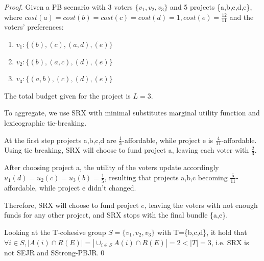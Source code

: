\documentclass[runningheads]{llncs}
\begin{document}
\begin{proof}
Given a PB scenario with 3 voters $\{v_1,v_2,v_3\}$ and 5 projects \{a,b,c,d,e\}, where $cost(a)=cost(b)=cost(c)=cost(d)=1, cost(e)=\frac{12}{11}$ and the voters' preferences:
\begin{enumerate}
    \item $v_1: \{(b),(c),(a,d),(e)\}$
    \item $v_2: \{(b),(a,c),(d),(e)\}$
    \item $v_3: \{(a,b),(c),(d),(e)\}$
\end{enumerate}

The total budget given for the project is $L=3$.

To aggregate, we use SRX with minimal substitutes marginal utility function and lexicographic tie-breaking.

At the first step projects a,b,c,d are $\frac{1}{3}$-affordable, while project e is $\frac{4}{11}$-affordable. Using tie breaking, SRX will choose to fund project a, leaving each voter with $\frac{2}{3}$.

After choosing project a, the utility of the voters update accordingly $u_1(d)=u_2(c)=u_3(b)=\frac{1}{5}$, resulting that projects a,b,c becoming $\frac{5}{11}$-affordable, while project e didn't changed.

Therefore, SRX will choose to fund project $e$, leaving the voters with not enough funds for any other project, and SRX stops with the final bundle \{a,e\}.

Looking at the T-cohesive group $S=\{v_1,v_2,v_3\}$ with T=\{b,c,d\}, it hold that $\forall i\in S, |A(i)\cap R(E)|=|\cup_{i\in S}A(i)\cap R(E)|=2<|T|=3$, i.e. SRX is not SEJR and SStrong-PBJR.\qed
\end{proof}






\end{document}
